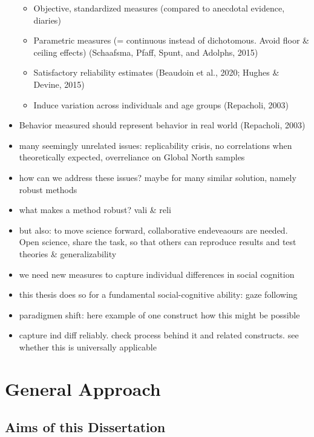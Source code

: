 \documentclass[
]{scrbook}
\providecommand{\tightlist}{%
  \setlength{\itemsep}{0pt}\setlength{\parskip}{0pt}}
\begin{document}
\begin{itemize}
  \begin{itemize}
  \tightlist
  \item
    Objective, standardized measures (compared to anecdotal evidence, diaries)
  \item
    Parametric measures (= continuous instead of dichotomous. Avoid floor \& ceiling effects) (Schaafsma, Pfaff, Spunt, and Adolphs, 2015)
  \item
    Satisfactory reliability estimates (Beaudoin et al., 2020; Hughes \& Devine, 2015)
  \item
    Induce variation across individuals and age groups (Repacholi, 2003)
  \end{itemize}
\item
  Behavior measured should represent behavior in real world (Repacholi, 2003)
\item
  many seemingly unrelated issues: replicability crisis, no correlations when theoretically expected, overreliance on Global North samples
\item
  how can we address these issues? maybe for many similar solution, namely robust methods
\item
  what makes a method robust? vali \& reli
\item
  but also: to move science forward, collaborative endeveaours are needed. Open science, share the task, so that others can reproduce results and test theories \& generalizability
\item
  we need new measures to capture individual differences in social cognition
\item
  this thesis does so for a fundamental social-cognitive ability: gaze following
\item
  paradigmen shift: here example of one construct how this might be possible
\item
  capture ind diff reliably. check process behind it and related constructs. see whether this is universally applicable
\end{itemize}

\chapter{General Approach}\label{general-approach}

\section{Aims of this Dissertation}\label{aims-of-this-dissertation}
\end{document}
